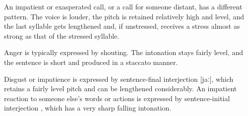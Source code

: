 
An impatient or exasperated call, or a call for someone distant, has a different pattern.  The voice is louder, the pitch is retained relatively high and level, and the last syllable gets lengthened and, if unstressed, receives a stress almost as strong as that of the stressed syllable.

 


Anger is typically expressed by shouting.  The intonation stays fairly level, and the sentence is short and produced in a staccato manner.

Disgust or impatience is expressed by sentence-final interjection  [jaː], which retains a fairly level pitch and can be lengthened considerably.  An impatient reaction to someone else's words or actions is expressed by sentence-initial interjection , which has a very sharp falling intonation.







